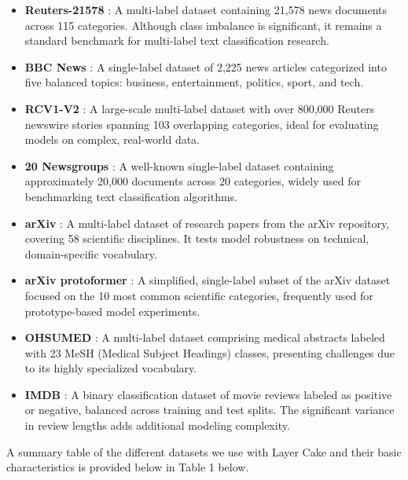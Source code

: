 \documentclass[final]{clv2025}
\begin{document}
\begin{itemize}
    \item \textbf{Reuters-21578} \cite{lewis1987reuters}: A multi-label dataset containing 21,578 news documents across 115 categories. Although class imbalance is significant, it remains a standard benchmark for multi-label text classification research.
    
    \item \textbf{BBC News} \cite{greene}: A single-label dataset of 2,225 news articles categorized into five balanced topics: business, entertainment, politics, sport, and tech.
    
    \item \textbf{RCV1-V2} \cite{lewis2004}: A large-scale multi-label dataset with over 800,000 Reuters newswire stories spanning 103 overlapping categories, ideal for evaluating models on complex, real-world data.
    
    \item \textbf{20 Newsgroups} \cite{LANG1995331}: A well-known single-label dataset containing approximately 20,000 documents across 20 categories, widely used for benchmarking text classification algorithms.
    
    \item \textbf{arXiv} \cite{sinha}: A multi-label dataset of research papers from the arXiv repository, covering 58 scientific disciplines. It tests model robustness on technical, domain-specific vocabulary.
    
    \item \textbf{arXiv protoformer} \cite{farhangi}: A simplified, single-label subset of the arXiv dataset focused on the 10 most common scientific categories, frequently used for prototype-based model experiments.
    
    \item \textbf{OHSUMED} \cite{sanderson}: A multi-label dataset comprising medical abstracts labeled with 23 MeSH (Medical Subject Headings) classes, presenting challenges due to its highly specialized vocabulary.
    
    \item \textbf{IMDB} \cite{maas}: A binary classification dataset of movie reviews labeled as positive or negative, balanced across training and test splits. The significant variance in review lengths adds additional modeling complexity.
\end{itemize}

A summary table of the different datasets we use with Layer Cake and their basic characteristics is provided below in Table 1 below.
\end{document}

